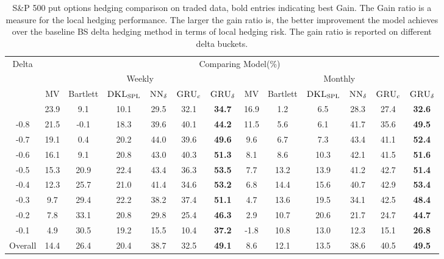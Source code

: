 \documentclass[letterpaper,12pt,titlepage,oneside,final]{book}
\numberwithin{equation}{section}
\theoremstyle{definition}
\newcommand{\model}{\textsc{GRU}_\delta}
\newcommand{\modelN}{\textsc{NN}_\delta}
\newcommand{\DKLs}{\bf\textsc{DKL}_{\text{SPL}}}
\begin{document}
\begin{table}[htp!]
	\centering
	\small
	\begin{threeparttable}
		\begin{tabular}{|c|cccccc| cccccc|}
			\hline
			\multirow{4}{*}{Delta}&\multicolumn{12}{c|}{Comparing Model(\%)}\\
			&\multicolumn{6}{c}{Weekly }&\multicolumn{6}{c|}{Monthly}\\ %
			&{\tiny MV}& {\tiny Bartlett}&\multicolumn{1}{c}{\tiny $\DKLs$}
			&\multicolumn{1}{c}{\tiny $\modelN$ } &\multicolumn{1}{c}{\tiny $\textsc{GRU}_{c}$} &\multicolumn{1}{c}{\tiny $\model$}
            &{\tiny MV}& {\tiny Bartlett} &\multicolumn{1}{c}{\tiny $\DKLs$}
            &\multicolumn{1}{c}{\tiny $\modelN$} &\multicolumn{1}{c}{\tiny $\textsc{GRU}_{c}$} & \multicolumn{1}{c|}{\tiny $\model$ } \\ \hline
			-0.9   &23.9  &9.1  &10.1   &29.5 &32.1 &\textbf{34.7}  &16.9 &1.2 &6.5   &28.3         & 27.4& \textbf{32.6}  \\

			-0.8   &21.5  &-0.1 &18.3   &39.6 &40.1 &\textbf{44.2}  &11.5 &5.6 &6.1   &41.7        &35.6 & \textbf{49.5}  \\

			-0.7   &19.1  &0.4  &20.2   &44.0 &39.6 &\textbf{49.6}  &9.6  &6.7 &7.3   &43.4        &41.1 & \textbf{52.4}  \\
			-0.6   &16.1  &9.1  &20.8   &43.0 &40.3 &\textbf{51.3}  &8.1  &8.6 &10.3  &42.1        &41.5 & \textbf{51.6}  \\
			-0.5   &15.3  &20.9 &22.4   &43.4&36.3 &\textbf{53.5}  &7.7  &13.2 &13.9  &41.2        &42.7 & \textbf{51.4}  \\
			-0.4   &12.3  &25.7 &21.0   &41.4&34.6 &\textbf{53.2}  &6.8  &14.4 &15.6  &40.7        &42.9 & \textbf{53.4}  \\
			-0.3   &9.7   &29.4 &22.2   &38.2&37.4 &\textbf{51.1}  &4.7  &13.6 &19.5  &34.1       &42.5  & \textbf{48.4}  \\
			-0.2   &7.8   &33.1 &20.8   &29.8 &25.4&\textbf{46.3}  &2.9  &10.7 &20.6  &21.7         & 24.7 &\textbf{44.7}  \\
			-0.1   &4.9   &30.5 &19.2   &15.5&10.4 &\textbf{37.2}  &-1.8 &10.8 &13.0  &12.3         &15.1& \textbf{26.8}  \\
			Overall&14.4  &26.4 &20.4   &38.7 &32.5&\textbf{49.1}  &8.6  &12.1 &13.5  &38.6        &40.5 & \textbf{49.5}  \\
			\hline
		\end{tabular}
		\caption{S\&P 500 put options hedging comparison on traded data, bold entries indicating best Gain. The Gain ratio is a measure for the local hedging performance. The larger the gain ratio is, the better improvement the model achieves over the baseline BS delta hedging method in terms of local hedging risk. The gain ratio is reported on different delta buckets. }
\label{SP500PutC}
\end{threeparttable}
\end{table}
\end{document}
